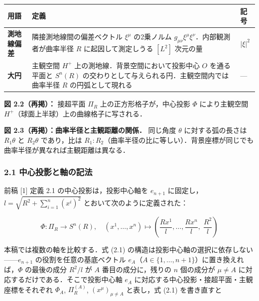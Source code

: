 \documentclass[a4paper,11pt]{ltjsarticle}
\theoremstyle{definition}
\begin{document}
{\def\LTcaptype{table} %
\begin{longtable}[]{@{}
  >{\raggedright\arraybackslash}p{}
  >{\raggedright\arraybackslash}p{}
  >{\raggedright\arraybackslash}p{}@{}}
\toprule\noalign{}
\begin{minipage}[b]{\linewidth}\raggedright
用語
\end{minipage} & \begin{minipage}[b]{\linewidth}\raggedright
定義
\end{minipage} & \begin{minipage}[b]{\linewidth}\raggedright
記号
\end{minipage} \\
\midrule\noalign{}
\endhead
\bottomrule\noalign{}
\endlastfoot
\textbf{測地線偏差} & 隣接測地線間の偏差ベクトル \(\xi^\mu\) の2乗ノルム \(g_{\mu\nu}\xi^\mu\xi^\nu\)．内部観測者が曲率半径 \(R\) に起因して測定しうる \([L^2]\) 次元の量 & \(\lvert\xi\rvert^2\) \\
\textbf{大円} & 主観空間 \(H^+\) 上の測地線．背景空間において投影中心 \(O\) を通る平面と \(S^n(R)\) の交わりとして与えられる円．主観空間内では曲率半径 \(R\) の円弧として現れる & --- \\
\end{longtable}
}

\textbf{図 2.2（再掲）：} 接超平面 \(\Pi_R\) 上の正方形格子が，中心投影 \(\Phi\) により主観空間 \(H^+\)（球面上半球）上の曲線格子に写される．

\textbf{図 2.3（再掲）：曲率半径と主観距離の関係．} 同じ角度 \(\theta\) に対する弧の長さは \(R_1\theta\) と \(R_2\theta\) であり，比は \(R_1 : R_2\)（曲率半径の比に等しい）．背景座標が同じでも曲率半径が異なれば主観距離は異なる．

\subsubsection{2.1 中心投影と軸の記法}\label{ux4e2dux5fc3ux6295ux5f71ux3068ux8ef8ux306eux8a18ux6cd5}

前稿 {[}1{]} 定義 2.1 の中心投影は，投影中心軸を \(e_{n+1}\) に固定し，\(l = \sqrt{R^2 + \sum_{i=1}^{n}(x^i)^2}\) とおいて次のように定義された：

\[\Phi: \Pi_R \to S^n(R), \quad (x^1, \ldots, x^n) \mapsto \left(\frac{Rx^1}{l}, \ldots, \frac{Rx^n}{l},\; \frac{R^2}{l}\right) \tag{2.1}\]

本稿では複数の軸を比較する．式 (2.1) の構造は投影中心軸の選択に依存しない------\(e_{n+1}\) の役割を任意の基底ベクトル \(e_A\)（\(A \in \{1, \ldots, n+1\}\)）に置き換えれば，\(\Phi\) の最後の成分 \(R^2/l\) が \(A\) 番目の成分に，残りの \(n\) 個の成分が \(\mu \neq A\) に対応するだけである．そこで投影中心軸 \(e_A\) に対応する中心投影・接超平面・主観座標をそれぞれ \(\Phi_A\), \(\Pi_R^{(A)}\), \((x^\mu)_{\mu \neq A}\) と表し，式 (2.1) を書き直すと
\end{document}
